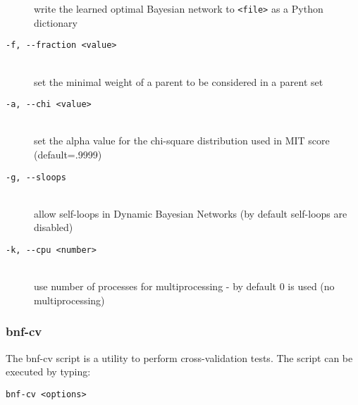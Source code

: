 \begin{description}
  write the learned optimal Bayesian network to \texttt{<file>} 
  as a Python dictionary 
\item[\texttt{-f, -\hspace{0pt}-fraction <value>}]~\\
 set the minimal weight of a parent to be considered in a parent set %
\item[\texttt{-a, -\hspace{0pt}-chi <value>}]~\\
 set the alpha value for the chi-square distribution used in MIT score (default=.9999)
\item[\texttt{-g, -\hspace{0pt}-sloops}]~\\
 allow self-loops in Dynamic Bayesian Networks (by default self-loops are disabled)
\item[\texttt{-k, -\hspace{0pt}-cpu <number>}]~\\
 use number of processes for multiprocessing - by default 0 is used (no multiprocessing)
\end{description}

\subsubsection{bnf-cv}

The bnf-cv script is a utility to perform cross-validation tests. The script can be executed by typing:
\begin{verbatim}
bnf-cv <options>
\end{verbatim}

